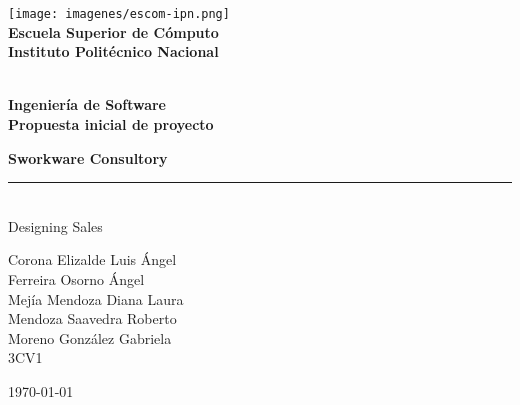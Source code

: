 
\begin{titlepage} %

    \begin{flushright}

	   \texttt{[image: imagenes/escom-ipn.png]}
	   \large \textbf{\\Escuela Superior de C\'omputo}
	   \large \textbf{\\Instituto Polit\'ecnico Nacional }%

	   \vspace{2.5cm} %

	   \large \textbf{\\Ingenier\'ia de Software}%
	   \large \textbf{\\Propuesta inicial de proyecto}%

	   \vspace{1.2cm} %

	   \large \textbf{Sworkware Consultory}\\%
	   \rule{5cm}{3pt} %
	   \large{\\ Designing Sales} %

	   \vspace{2.5cm} %

		Corona Elizalde Luis \'Angel\\
		Ferreira Osorno \'Angel \\
		Mej\'ia Mendoza Diana Laura \\
		Mendoza Saavedra Roberto  \\
		Moreno Gonz\'alez Gabriela\\
	    3CV1 %

	   \vspace{2.5cm} %

	   \today

    \end{flushright}

\end{titlepage}
